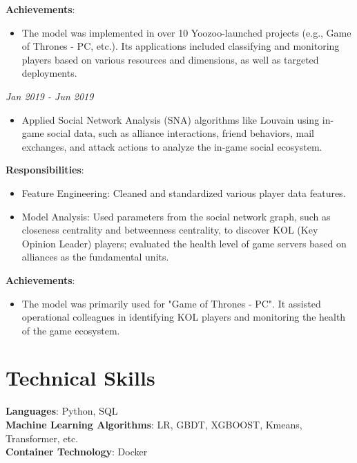 \documentclass[letterpaper,11pt]{article}
\begin{document}
\textbf{Achievements}:
\begin{itemize}
    \item The model was implemented in over 10 Yoozoo-launched projects (e.g., Game of Thrones - PC,  etc.). Its applications included classifying and monitoring players based on various resources and dimensions, as well as targeted deployments.
\end{itemize}

 \hfill \textit{Jan 2019 - Jun 2019}
\begin{itemize}
    \item Applied Social Network Analysis (SNA) algorithms like Louvain using in-game social data, such as alliance interactions, friend behaviors, mail exchanges, and attack actions to analyze the in-game social ecosystem.
\end{itemize}

\textbf{Responsibilities}:
\begin{itemize}
    \item Feature Engineering: Cleaned and standardized various player data features.
    \item Model Analysis: Used parameters from the social network graph, such as closeness centrality and betweenness centrality, to discover KOL (Key Opinion Leader) players; evaluated the health level of game servers based on alliances as the fundamental units.
\end{itemize}

\textbf{Achievements}:
\begin{itemize}
    \item The model was primarily used for "Game of Thrones - PC". It assisted operational colleagues in identifying KOL players and monitoring the health of the game ecosystem.
\end{itemize}


\section{Technical Skills}
\begin{itemize}[leftmargin=0.15in, label={}]
    \small{\item{
     \textbf{Languages}{: Python, SQL} \\
     \textbf{Machine Learning Algorithms}{: LR, GBDT, XGBOOST, Kmeans, Transformer, etc.} \\
     \textbf{Container Technology}{: Docker} \\
    }}
\end{itemize}
\vspace{-16pt}
\end{document}
